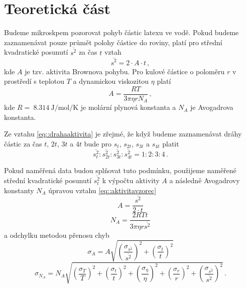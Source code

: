 \section*{Teoretická část}
Budeme mikroskpem pozorovat pohyb částic latexu ve vodě.
Pokud budeme zaznamenávat pouze průmět polohy částice do roviny, platí pro střední kvadratické posunutí $\overline{s^2}$ za čas $t$ vztah \cite{skripta}
\begin{equation} \label{eq::drahaaktivita}
\overline{s^2}=2 \cdot A \cdot t \,,
\end{equation}
kde $A$ je tzv. aktivita Brownova pohybu.
Pro kulové částice o poloměru $r$ v prostředí s teplotou $T$ a dynamickou viskozitou $\eta$ platí \cite{skripta}
\begin{equation} \label{eq::aktivitavzorec}
A=\frac{RT}{3 \pi \eta r N_A} \,,
\end{equation}
kde $R=~\SI{8.314}{\joule \per \mole \per \kelvin}$ je molární plynová konstanta a $N_A$ je Avogadrova konstanta.

Ze vztahu \eqref{eq::drahaaktivita} je zřejmé, že když budeme zaznamenávat dráhy částic za čas $t$, $2t$, $3t$ a $4t$ bude pro $s_t$, $s_{2t}$, $s_{3t}$ a $s_{4t}$ platit
\begin{equation}
\overline{s_t^2}:\overline{s_{2t}^2}:\overline{s_{3t}^2}:\overline{s_{4t}^2} = 1:2:3:4 \,.
\end{equation}

Pokud naměřená data budou splňovat tuto podmínku, použijeme naměřené střední kvadratické posunutí $\overline{s_t^2}$ k výpočtu aktivity $A$ a následně Avogadrovy konstanty $N_A$ úpravou vztahu \eqref{eq::aktivitavzorec}
\begin{equation}
A=\frac{\overline{s^2}}{2 \cdot t}
\end{equation}
\begin{equation}
N_A=\frac{2RTt}{3\pi \eta r \overline{s^2}}
\end{equation}
a odchylku metodou přenosu chyb
\begin{equation}
\sigma_A = A \sqrt{
\left( \frac{\sigma_{\overline{s^2}}}{\overline{s^2}}  \right)^2 +
\left( \frac{\sigma_t}{t}    \right)^2
}
\end{equation}
\begin{equation}
\sigma_{N_A}=N_A \sqrt{
\left( \frac{\sigma_T}{T} \right)^2  +
\left( \frac{\sigma_t}{t} \right)^2  +
\left( \frac{\sigma_\eta}{\eta} \right)^2  +
\left( \frac{\sigma_r}{r} \right)^2  +
\left( \frac{\sigma_{\overline{s^2}}}{\overline{s^2}} \right)^2
} \,.
\end{equation}